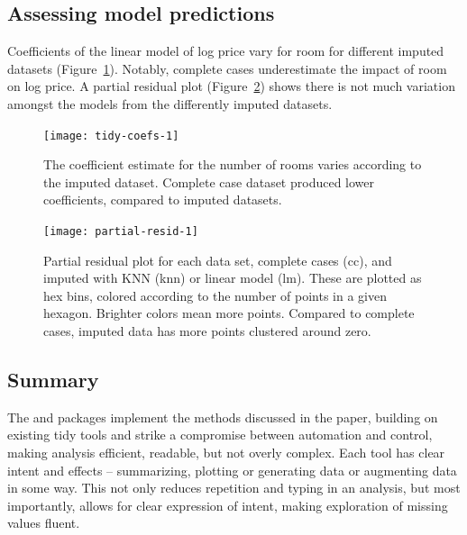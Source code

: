 \documentclass[article]{jss}
\begin{document}
\hypertarget{case-study-assess-model}{%
\subsection{Assessing model predictions}\label{case-study-assess-model}}

Coefficients of the linear model of log price vary for room for different
imputed datasets (Figure~\ref{fig:tidy-coefs}).  Notably, complete cases
underestimate the impact of room on log price.  A partial residual plot
(Figure~\ref{fig:partial-resid}) shows there is not much variation amongst
the models from the differently imputed datasets.

\begin{figure}[t!]
\centering
\texttt{[image: tidy-coefs-1]}
\caption[The coefficient estimate for the number of rooms varies according
to the imputed dataset]{The coefficient estimate for the number of rooms
varies according to the imputed dataset.  Complete case dataset produced
lower coefficients, compared to imputed datasets.}\label{fig:tidy-coefs}
\end{figure}

\begin{figure}
\centering
\texttt{[image: partial-resid-1]}
\caption[Partial residual plot for each data set, complete cases (cc), and
imputed with KNN (knn) or linear model (lm)]{Partial residual plot for each
data set, complete cases (cc), and imputed with KNN (knn) or linear model
(lm).  These are plotted as hex bins, colored according to the number of
points in a given hexagon.  Brighter colors mean more points.  Compared to
complete cases, imputed data has more points clustered around
zero.}\label{fig:partial-resid}
\end{figure}

\hypertarget{case-study-summary}{%
\subsection{Summary}\label{case-study-summary}}

The  and  packages implement the methods discussed
in the paper, building on existing tidy tools and strike a compromise
between automation and control, making analysis efficient, readable, but not
overly complex.  Each tool has clear intent and effects -- summarizing,
plotting or generating data or augmenting data in some way.  This not only
reduces repetition and typing in an analysis, but most importantly, allows
for clear expression of intent, making exploration of missing values fluent.
\end{document}
